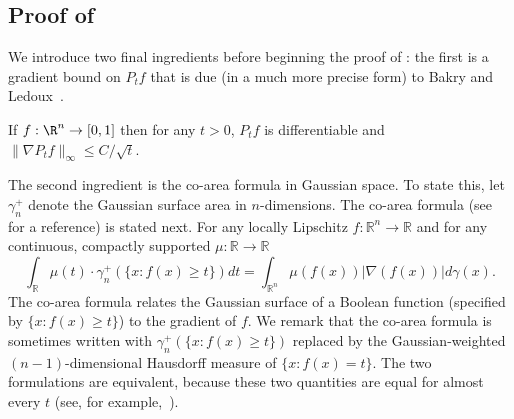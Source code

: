 \documentclass{toc}
\begin{document}
%

\subsection{Proof of }

We introduce two final ingredients before beginning the proof of : the first is a gradient bound on $P_t f$
that is due (in a much more precise form) to Bakry and Ledoux~\cite{BakryLedoux:96}.
\begin{theorem}\label{thm:bakry-ledoux}
  If $f: \R^n \to [0, 1]$ then for any $t > 0$, $P_t f$ is differentiable and $\|\nabla P_t f\|_\infty \le C/\sqrt{t}$.
\end{theorem}

The second ingredient is the co-area formula in Gaussian space. To state this, let $\gamma_n^{+}$ denote the Gaussian surface area in $n$-dimensions. The co-area formula (see~\cite{federer1969} for a reference) is stated next. For any locally Lipschitz $f: \mathbb{R}^n \rightarrow \mathbb{R}$ and for any continuous, compactly supported $\mu : \mathbb{R} \rightarrow \mathbb{R}$ 
\[
\int_{\mathbb{R}} \mu(t) \cdot \gamma_n^{+} (\{x: f(x) \ge t\}) dt = \int_{\mathbb{R}^n} \mu(f(x)) |\nabla(f(x))| d \gamma(x).
\]
The co-area formula relates the Gaussian surface of a Boolean function (specified by $\{x: f(x) \ge t\}$) to the gradient of $f$. We remark that the co-area formula is sometimes written with $\gamma_n^+(\{x: f(x) \ge t\})$ replaced by the Gaussian-weighted $(n-1)$-dimensional Hausdorff measure of $\{x: f(x) = t\}$. The two formulations are equivalent, because these two quantities are equal for almost every $t$ (see, for example,~\cite[Chapter 13]{Maggi:12}).
\end{document}
